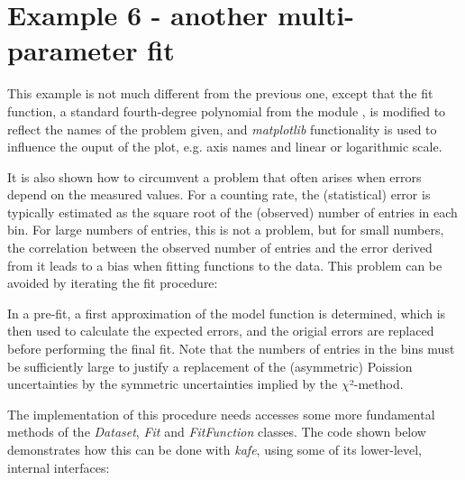 \documentclass[a4paper,10pt,english]{sphinxmanual}
\begin{document}
\section{Example 6 - another multi-parameter fit}
\label{index:example-6-another-multi-parameter-fit}
This example is not much different from the previous one, except that
the fit function, a standard fourth-degree polynomial from the module
, is modified to reflect the names of the problem
given, and \emph{matplotlib} functionality is used to influence the
ouput of the plot, e.g. axis names and linear or logarithmic scale.

It is also shown how to circumvent a problem that
often arises when errors depend on the measured values.
For a counting rate, the (statistical) error is typically estimated
as the square root of the (observed) number of entries in each bin.
For large numbers of entries, this is not a problem,
but for small numbers, the correlation between the observed
number of entries and the error derived from it leads to a
bias when fitting functions to the data. This problem can be
avoided by iterating the fit procedure:

In a pre-fit, a first approximation of the model function is
determined, which is then used to calculate
the expected errors, and the origial errors are
replaced before performing the final fit. Note that the numbers
of entries in the bins must be sufficiently large to justify
a replacement of the (asymmetric) Poission uncertainties by
the symmetric uncertainties implied by the \(\chi\)²-method.

The implementation of this  procedure needs accesses some
more fundamental methods of the \emph{Dataset}, \emph{Fit} and
\emph{FitFunction} classes. The code shown below demonstrates
how this can be done with \emph{kafe}, using some of its lower-level,
internal interfaces:
\end{document}
